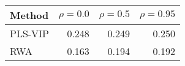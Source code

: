 \begin{small}
\begin{ttfamily}
\begin{tabular}{lrrr}
\toprule
Method & $\rho=0.0$ & $\rho=0.5$ & $\rho=0.95$ \\
\midrule
PLS-VIP & 0.248 & 0.249 & 0.250 \\
RWA & 0.163 & 0.194 & 0.192 \\
\bottomrule
\end{tabular}
\end{ttfamily}
\end{small}
